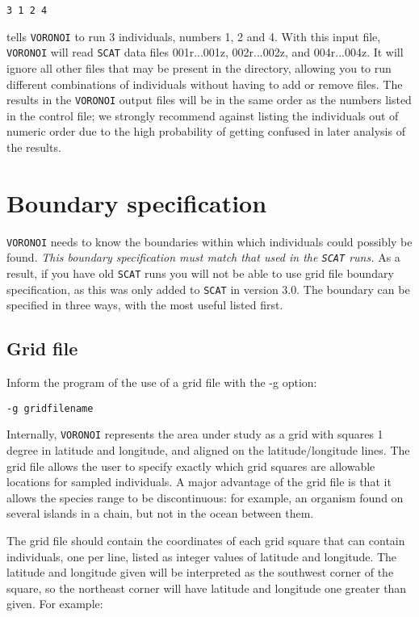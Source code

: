 \documentclass[10pt,titlepage,times,letterpaper]{article}
\def\SCAT{{\tt SCAT} }
\def\VORONOI{{\tt VORONOI} }
\begin{document}
{\tt 3 1 2 4}

tells \VORONOI to run 3 individuals, numbers 1, 2 and 4.  
With this input file, \VORONOI will read \SCAT data files 001r...001z, 002r...002z, and 004r...004z.
It will ignore all other files that may be present in the directory, allowing you to run different 
combinations of individuals without having to add or remove files.  The results in the \VORONOI
output files will be in the same order as the numbers listed in the control file; we strongly
recommend against listing the individuals out of numeric order due to the high probability
of getting confused in later analysis of the results.

\section{Boundary specification}

\VORONOI needs to know the boundaries within which individuals could possibly be found. {\it This boundary
specification must match that used in the \SCAT runs.}  As a result, if you have old \SCAT runs you
will not be able to use grid file boundary specification, as this was only added to \SCAT in version 3.0.
The boundary can be specified in three ways, with the most useful listed first.

\subsection{Grid file}

Inform the program of the use of a grid file with the -g option:

\medskip
{\noindent
{\tt -g gridfilename}
}
\medskip

Internally, \VORONOI represents the area under study as a grid with squares 1 degree in latitude
and longitude, and aligned on the latitude/longitude lines.  The grid file allows the user to
specify exactly which grid squares are allowable locations for sampled individuals.  A major
advantage of the grid file is that it allows the species range to be discontinuous:  for example, 
an organism found on several islands in a chain, but not in the ocean between them. 

The grid file should contain the coordinates of each grid square that can contain individuals,
one per line, listed as integer values of latitude and longitude. 
The latitude and longitude given will be interpreted as the southwest
corner of the square, so the northeast corner will have latitude and longitude 
one greater than given.  For example:
\end{document}
